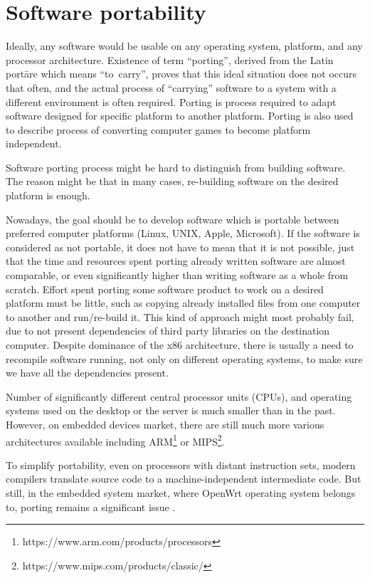 \chapter{Software portability}\label{porting}

Ideally, any software would be usable on any operating system, platform, and any processor architecture.
Existence of term “porting”, derived from the Latin portāre which means “to~carry”, proves that this ideal situation does not occurs that often, and the actual process of “carrying” software to a system with a different environment is often required.
Porting is process required to adapt software designed for specific platform to another platform.
Porting is also used to describe process of converting computer games to become platform independent\cite{wiki_porting}.

Software porting process might be hard to distinguish from building software.
The reason might be that in many cases, re-building software on the desired platform is enough.

Nowadays, the goal should be to develop software which is portable between preferred computer platforms (Linux, UNIX, Apple, Microsoft).
If the software is considered as not portable, it does not have to mean that it is not possible, just that the time and resources spent porting already written software are almost comparable, or even significantly higher than writing software as a whole from scratch.
Effort spent porting some software product to work on a desired platform must be little, such as copying already installed files from one computer to another and run/re-build it.
This kind of approach might most probably fail, due to not present dependencies of third party libraries on the destination computer.
Despite dominance of the x86 architecture, there is usually a need to recompile software running, not only on different operating systems, to make sure we have all the dependencies present.

Number of significantly different central processor units (CPUs), and operating systems used on the desktop or the server is much smaller than in the past.
However, on embedded devices market, there are still much more various architectures available including ARM\footnote{https://www.arm.com/products/processors} or MIPS\footnote{https://www.mips.com/products/classic/}.

To simplify portability, even on processors with distant instruction sets, modern compilers translate source code to a machine-independent intermediate code.
But still, in the embedded system market, where OpenWrt operating system belongs to, porting remains a significant issue \cite{porting_software}.



